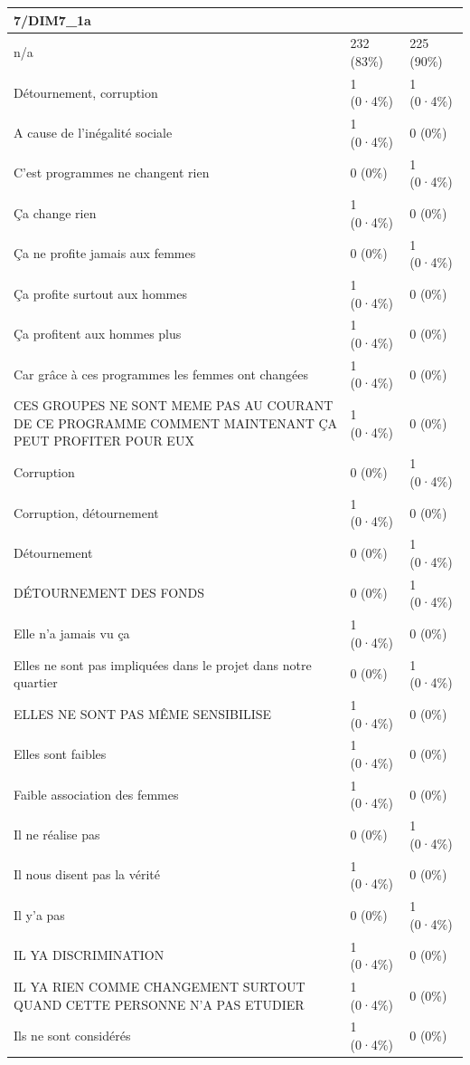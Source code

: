 \documentclass[
]{book}
\begin{document}
\begin{tabular}{l|l|l}
\hline
7/DIM7\_1a &  & \\
\hline
n/a & 232 (83\%) & 225 (90\%)\\
\hline
Détournement, corruption & 1 (0·4\%) & 1 (0·4\%)\\
\hline
A cause de l'inégalité sociale & 1 (0·4\%) & 0 (0\%)\\
\hline
C'est programmes ne changent rien & 0 (0\%) & 1 (0·4\%)\\
\hline
Ça change rien & 1 (0·4\%) & 0 (0\%)\\
\hline
Ça ne profite jamais aux femmes & 0 (0\%) & 1 (0·4\%)\\
\hline
Ça profite surtout aux hommes & 1 (0·4\%) & 0 (0\%)\\
\hline
Ça profitent aux hommes plus & 1 (0·4\%) & 0 (0\%)\\
\hline
Car grâce à ces programmes les femmes ont changées & 1 (0·4\%) & 0 (0\%)\\
\hline
CES GROUPES NE SONT MEME PAS AU COURANT DE CE PROGRAMME COMMENT MAINTENANT ÇA PEUT PROFITER POUR EUX & 1 (0·4\%) & 0 (0\%)\\
\hline
Corruption & 0 (0\%) & 1 (0·4\%)\\
\hline
Corruption, détournement & 1 (0·4\%) & 0 (0\%)\\
\hline
Détournement & 0 (0\%) & 1 (0·4\%)\\
\hline
DÉTOURNEMENT DES FONDS & 0 (0\%) & 1 (0·4\%)\\
\hline
Elle n'a jamais vu ça & 1 (0·4\%) & 0 (0\%)\\
\hline
Elles ne sont pas impliquées dans le projet dans notre quartier & 0 (0\%) & 1 (0·4\%)\\
\hline
ELLES NE SONT PAS MÊME SENSIBILISE & 1 (0·4\%) & 0 (0\%)\\
\hline
Elles sont faibles & 1 (0·4\%) & 0 (0\%)\\
\hline
Faible association des femmes & 1 (0·4\%) & 0 (0\%)\\
\hline
Il ne réalise pas & 0 (0\%) & 1 (0·4\%)\\
\hline
Il nous disent pas la vérité & 1 (0·4\%) & 0 (0\%)\\
\hline
Il y'a pas & 0 (0\%) & 1 (0·4\%)\\
\hline
IL YA DISCRIMINATION & 1 (0·4\%) & 0 (0\%)\\
\hline
IL YA RIEN COMME CHANGEMENT SURTOUT QUAND CETTE PERSONNE N'A PAS ETUDIER & 1 (0·4\%) & 0 (0\%)\\
\hline
Ils ne sont considérés & 1 (0·4\%) & 0 (0\%)\\

\end{tabular}
\end{document}
